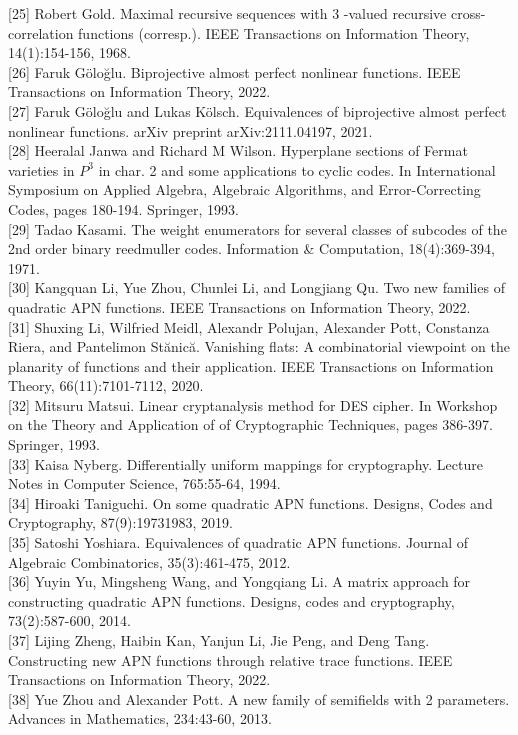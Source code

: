 \documentclass[10pt]{article}
\begin{document}
[25] Robert Gold. Maximal recursive sequences with 3 -valued recursive cross-correlation functions (corresp.). IEEE Transactions on Information Theory, 14(1):154-156, 1968.\\[0pt]
[26] Faruk Göloğlu. Biprojective almost perfect nonlinear functions. IEEE Transactions on Information Theory, 2022.\\[0pt]
[27] Faruk Göloğlu and Lukas Kölsch. Equivalences of biprojective almost perfect nonlinear functions. arXiv preprint arXiv:2111.04197, 2021.\\[0pt]
[28] Heeralal Janwa and Richard M Wilson. Hyperplane sections of Fermat varieties in $P^{3}$ in char. 2 and some applications to cyclic codes. In International Symposium on Applied Algebra, Algebraic Algorithms, and Error-Correcting Codes, pages 180-194. Springer, 1993.\\[0pt]
[29] Tadao Kasami. The weight enumerators for several classes of subcodes of the 2nd order binary reedmuller codes. Information \& Computation, 18(4):369-394, 1971.\\[0pt]
[30] Kangquan Li, Yue Zhou, Chunlei Li, and Longjiang Qu. Two new families of quadratic APN functions. IEEE Transactions on Information Theory, 2022.\\[0pt]
[31] Shuxing Li, Wilfried Meidl, Alexandr Polujan, Alexander Pott, Constanza Riera, and Pantelimon Stănică. Vanishing flats: A combinatorial viewpoint on the planarity of functions and their application. IEEE Transactions on Information Theory, 66(11):7101-7112, 2020.\\[0pt]
[32] Mitsuru Matsui. Linear cryptanalysis method for DES cipher. In Workshop on the Theory and Application of of Cryptographic Techniques, pages 386-397. Springer, 1993.\\[0pt]
[33] Kaisa Nyberg. Differentially uniform mappings for cryptography. Lecture Notes in Computer Science, 765:55-64, 1994.\\[0pt]
[34] Hiroaki Taniguchi. On some quadratic APN functions. Designs, Codes and Cryptography, 87(9):19731983, 2019.\\[0pt]
[35] Satoshi Yoshiara. Equivalences of quadratic APN functions. Journal of Algebraic Combinatorics, 35(3):461-475, 2012.\\[0pt]
[36] Yuyin Yu, Mingsheng Wang, and Yongqiang Li. A matrix approach for constructing quadratic APN functions. Designs, codes and cryptography, 73(2):587-600, 2014.\\[0pt]
[37] Lijing Zheng, Haibin Kan, Yanjun Li, Jie Peng, and Deng Tang. Constructing new APN functions through relative trace functions. IEEE Transactions on Information Theory, 2022.\\[0pt]
[38] Yue Zhou and Alexander Pott. A new family of semifields with 2 parameters. Advances in Mathematics, 234:43-60, 2013.
\end{document}
